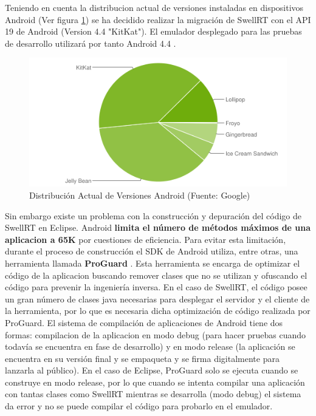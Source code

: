 	Teniendo en cuenta la distribucion actual de versiones instaladas en dispositivos Android \cite{ref:android_dist} (Ver figura \ref{fig:android_Usage}) se ha decidido realizar la migración de SwellRT con el API 19 de Android (Version 4.4 "KitKat"). El emulador desplegado para las pruebas de desarrollo utilizará por tanto Android 4.4 .

	\begin{figure}[H]
      \centering
	\includegraphics[keepaspectratio, scale=0.8]{Media/Captures/androidUsage.png}
      \caption{Distribución Actual de Versiones Android (Fuente: Google)}
      \label{fig:android_Usage}
    \end{figure}

	Sin embargo existe un problema con la construcción y depuración del código de SwellRT en Eclipse. Android \textbf{limita el número de métodos máximos de una aplicacion a 65K} \cite{ref:android_limit65k} por cuestiones de eficiencia. Para evitar esta limitación, durante el proceso de construcción el SDK de Android utiliza, entre otras, una herramienta llamada \textbf{ProGuard} \cite{ref:android_proguard}. Esta herramienta se encarga de optimizar el código de la aplicacion buscando remover clases que no se utilizan y ofuscando el código para prevenir la ingeniería inversa. En el caso de SwellRT, el código posee un gran número de clases java necesarias para desplegar el servidor y el cliente de la herramienta, por lo que es necesaria dicha optimización de código realizada por ProGuard. El sistema de compilación de aplicaciones de Android tiene dos formas: compilacion de la aplicacion en modo debug (para hacer pruebas cuando todavía se encuentra en fase de desarrollo) y en modo release (la aplicación se encuentra en su versión final y se empaqueta y se firma digitalmente para lanzarla al público). En el caso de Eclipse, ProGuard solo se ejecuta cuando se construye en modo release, por lo que cuando se intenta compilar una aplicación con tantas clases como SwellRT mientras se desarrolla (modo debug) el sistema da error y no se puede compilar el código para probarlo en el emulador. \\[.2cm]

